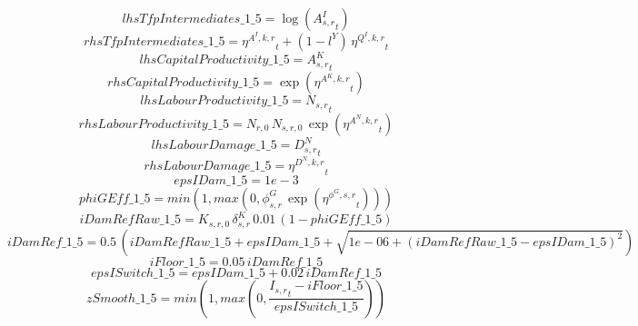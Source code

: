 \begin{dmath*}
lhsTfpIntermediates\_1\_5 = \log\left({{A^{I}_{s,r}}}_{t}\right)
\end{dmath*}
\begin{dmath*}
rhsTfpIntermediates\_1\_5 = {{\eta^{A^{I},k,r}}}_{t}+\left(1-{{l^{Y}}}\right)\, {{\eta^{Q^{I},k,r}}}_{t}
\end{dmath*}
\begin{dmath*}
lhsCapitalProductivity\_1\_5 = {{A^{K}_{s,r}}}_{t}
\end{dmath*}
\begin{dmath*}
rhsCapitalProductivity\_1\_5 = \exp\left({{\eta^{A^{K},k,r}}}_{t}\right)
\end{dmath*}
\begin{dmath*}
lhsLabourProductivity\_1\_5 = {{N_{s,r}}}_{t}
\end{dmath*}
\begin{dmath*}
rhsLabourProductivity\_1\_5 = {{N_{r,0}}}\, {{N_{s,r,0}}}\, \exp\left({{\eta^{A^{N},k,r}}}_{t}\right)
\end{dmath*}
\begin{dmath*}
lhsLabourDamage\_1\_5 = {{D^N_{s,r}}}_{t}
\end{dmath*}
\begin{dmath*}
rhsLabourDamage\_1\_5 = {{\eta^{D^{N},k,r}}}_{t}
\end{dmath*}
\begin{dmath*}
epsIDam\_1\_5 = 1e-3
\end{dmath*}
\begin{dmath*}
phiGEff\_1\_5 = min(1,max(0,{{\phi^{G}_{s,r}}}\, \exp\left({{\eta^{\phi^{G},s,r}}}_{t}\right)))
\end{dmath*}
\begin{dmath*}
iDamRefRaw\_1\_5 = {{K_{s,r,0}}}\, {{\delta^{K}_{s,r}}}\, 0.01\, \left(1-{phiGEff\_1\_5}\right)
\end{dmath*}
\begin{dmath*}
iDamRef\_1\_5 = 0.5\, \left({iDamRefRaw\_1\_5}+{epsIDam\_1\_5}+\sqrt{1e-06+\left({iDamRefRaw\_1\_5}-{epsIDam\_1\_5}\right)^{2}}\right)
\end{dmath*}
\begin{dmath*}
iFloor\_1\_5 = 0.05\, {iDamRef\_1\_5}
\end{dmath*}
\begin{dmath*}
epsISwitch\_1\_5 = {epsIDam\_1\_5}+0.02\, {iDamRef\_1\_5}
\end{dmath*}
\begin{dmath*}
zSmooth\_1\_5 = min(1,max(0,\frac{{{I_{s,r}}}_{t}-{iFloor\_1\_5}}{{epsISwitch\_1\_5}}))
\end{dmath*}
